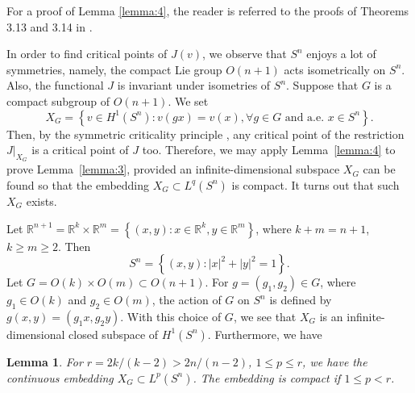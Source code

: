 \documentclass[11pt]{article}
\newtheorem{lemma}{Lemma}
\begin{document}
For a proof of Lemma \ref{lemma:4},
the reader is referred to the proofs of Theorems 3.13 and 3.14 in \cite{ambrosetti1973dual}.

In order to find critical points of $J(v)$, we observe that $S^n$ enjoys a lot of symmetries, 
namely, the compact Lie group $O(n+1)$ acts isometrically on $S^n$.
Also, the functional $J$ is invariant under isometries of $S^n$.
Suppose that $G$ is a compact subgroup of $O(n+1)$. We set
\[
X_G=\left\{v \in H^1(S^n): v(g x)=v(x), \forall g \in G \text { and a.e. } x \in S^n\right\} .
\]
Then, by the symmetric criticality principle \cite{palais1979principle},
any critical point of the restriction $J|_{X_G}$ is a critical point of $J$ too.
Therefore, we may apply Lemma~\ref{lemma:4} to prove Lemma~\ref{lemma:3},
provided an infinite-dimensional subspace $X_G$ can be found
so that the embedding $X_G \subset L^q(S^n)$ is compact.
It turns out that such $X_G$ exists.

Let $\mathbb{R}^{n+1} = \mathbb{R}^k \times \mathbb{R}^m = 
  \left\{(x, y): x \in \mathbb{R}^k, y \in \mathbb{R}^m\right\}$,
where $k+m=n+1$, $k \geq m \geq 2$. Then
\[
S^n=\left\{(x, y):|x|^2+|y|^2=1\right\} .
\]
Let $G=O(k) \times O(m) \subset O(n+1)$. For $g=\left(g_1, g_2\right) \in G$,
where $g_1 \in O(k)$ and $g_2 \in O(m)$,
the action of $G$ on $S^n$ is defined by $g(x, y)=\left(g_1 x, g_2 y\right)$.
With this choice of $G$, we see that $X_G$ is an infinite-dimensional closed subspace of 
$H^1(S^n)$. Furthermore, we have

\begin{lemma}\label{lemma:5}
  For $r=2 k /(k-2)>2 n /(n-2)$, $1 \leq p \leq r$,
  we have the continuous embedding $X_G \subset L^p\left(S^n\right)$.
  The embedding is compact if $1 \leq p<r$.
\end{lemma}
\end{document}
